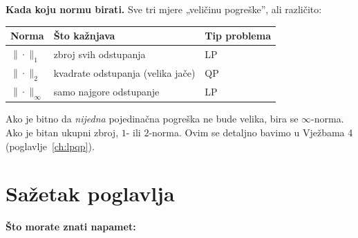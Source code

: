 \textbf{Kada koju normu birati.} Sve tri mjere „veličinu pogreške”, ali
različito:

\begin{center}
\begin{tabular}{lll}
\toprule
\textbf{Norma} & \textbf{Što kažnjava} & \textbf{Tip problema} \\
\midrule
$\|\cdot\|_1$ & zbroj svih odstupanja & LP \\
$\|\cdot\|_2$ & kvadrate odstupanja (velika jače) & QP \\
$\|\cdot\|_\infty$ & samo najgore odstupanje & LP \\
\bottomrule
\end{tabular}
\end{center}

Ako je bitno da \emph{nijedna} pojedinačna pogreška ne bude velika, bira se
$\infty$-norma. Ako je bitan ukupni zbroj, $1$- ili $2$-norma. Ovim se detaljno
bavimo u Vježbama 4 (poglavlje~\ref{ch:lpqp}).

\section{Sažetak poglavlja}

\textbf{Što morate znati napamet:}

